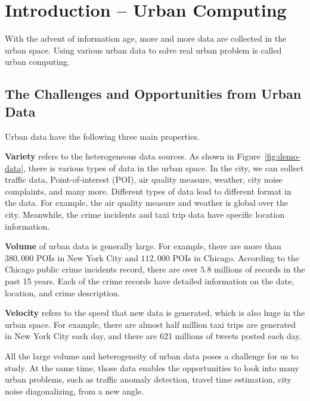 \chapter{Introduction -- Urban Computing} \label{chapter1:introduction}



With the advent of information age, more and more data are collected in the urban space. Using various urban data to solve real urban problem is called urban computing.



\section{The Challenges and Opportunities from Urban Data}


Urban data have the following three main properties. 

\textbf{Variety} refers to the heterogeneous data sources. As shown in Figure~\ref{fig:demo-data}, there is various types of data in the urban space. In the city, we can collect traffic data, Point-of-interest (POI), air quality measure, weather,  city noise complaints, and many more. Different types of data lead to different format in the data. For example, the air quality measure and weather is global over the city. Meanwhile, the crime incidents and taxi trip data have specific location information.


\textbf{Volume} of urban data is generally large. For example, there are more than $380,000$ POIs in New York City and $112,000$ POIs in Chicago. According to the Chicago public crime incidents record, there are over $5.8$ millions of records in the past 15 years. Each of the crime records have detailed information on the date, location, and crime description. 


\textbf{Velocity} refers to the speed that new data is generated, which is also huge in the urban space. For example, there are almost half million taxi trips are generated in New York City each day, and there are 621 millions of tweets posted each day.


All the large volume and heterogeneity of urban data poses a challenge for us to study. At the same time, those data enables the opportunities to look into many urban problems, such as traffic anomaly detection,  travel time estimation, city noise diagonalizing, from a new angle.



